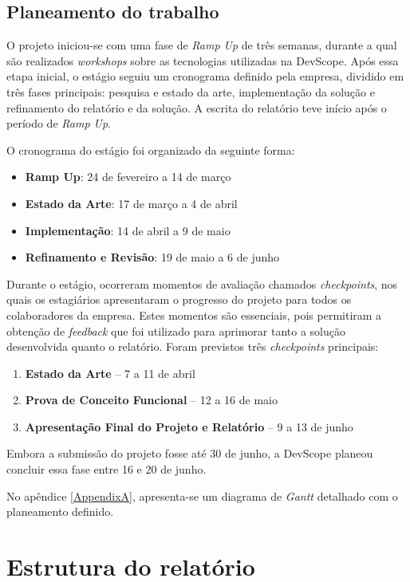 \subsection{Planeamento do trabalho}  

O projeto iniciou-se com uma fase de \textit{Ramp Up} de três semanas, durante a qual são realizados \textit{workshops} sobre as tecnologias utilizadas na DevScope. Após essa etapa inicial, o estágio seguiu um cronograma definido pela empresa, dividido em três fases principais: pesquisa e estado da arte, implementação da solução e refinamento do relatório e da solução. A escrita do relatório teve início após o período de \textit{Ramp Up}.

O cronograma do estágio foi organizado da seguinte forma:

\begin{itemize}
    \item \textbf{Ramp Up}: 24 de fevereiro a 14 de março
    \item \textbf{Estado da Arte}: 17 de março a 4 de abril
    \item \textbf{Implementação}: 14 de abril a 9 de maio
    \item \textbf{Refinamento e Revisão}: 19 de maio a 6 de junho
\end{itemize}

Durante o estágio, ocorreram momentos de avaliação chamados \textit{checkpoints}, nos quais os estagiários apresentaram o progresso do projeto para todos os colaboradores da empresa. Estes momentos são essenciais, pois permitiram a obtenção de \textit{feedback} que foi utilizado para aprimorar tanto a solução desenvolvida quanto o relatório. Foram previstos três \textit{checkpoints} principais:

\begin{enumerate}
    \item \textbf{Estado da Arte} – 7 a 11 de abril
    \item \textbf{Prova de Conceito Funcional} – 12 a 16 de maio
    \item \textbf{Apresentação Final do Projeto e Relatório} – 9 a 13 de junho
\end{enumerate}

Embora a submissão do projeto fosse até 30 de junho, a DevScope planeou concluir essa fase entre 16 e 20 de junho.

 No apêndice \ref{AppendixA}, apresenta-se um diagrama de \textit{Gantt} detalhado com o planeamento definido.


\section{Estrutura do relatório}

